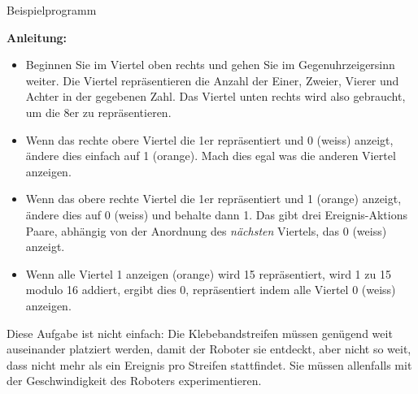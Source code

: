 {\raggedleft \hfill Beispielprogramm }

\textbf{Anleitung:}

\begin{itemize}
	\item Beginnen Sie im Viertel oben rechts und gehen Sie im Gegenuhrzeigersinn weiter. Die Viertel repräsentieren die Anzahl der Einer, Zweier, Vierer und Achter in der gegebenen Zahl. Das Viertel unten rechts wird also gebraucht, um die 8er zu repräsentieren.
	\item Wenn das rechte obere Viertel die 1er repräsentiert und 0 (weiss) anzeigt, ändere dies einfach auf 1 (orange). Mach dies egal was die anderen Viertel anzeigen.
	\item Wenn das obere rechte Viertel die 1er repräsentiert und 1 (orange) anzeigt, ändere dies auf 0 (weiss) und behalte dann 1. Das gibt drei Ereignis-Aktions Paare, abhängig von der Anordnung des  \emph{nächsten} Viertels, das 0 (weiss) anzeigt. 
	\item Wenn alle Viertel 1 anzeigen (orange) wird 15 repräsentiert, wird 1 zu 15 modulo 16 addiert, ergibt dies 0, repräsentiert indem alle Viertel 0 (weiss) anzeigen.
\end{itemize}

\bigskip


\bigskip


\bigskip

Diese Aufgabe ist nicht einfach: Die Klebebandstreifen müssen genügend weit auseinander platziert werden, damit der Roboter sie entdeckt, aber nicht so weit, dass nicht mehr als ein Ereignis pro Streifen stattfindet. Sie müssen allenfalls mit der Geschwindigkeit des Roboters experimentieren.
